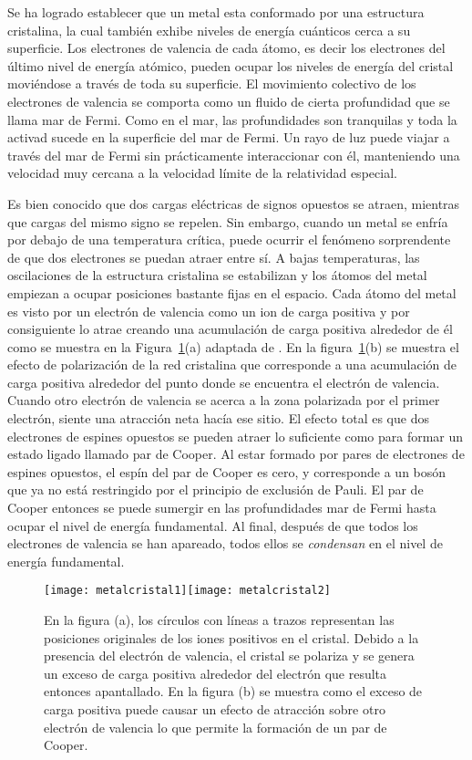 Se ha logrado establecer que un metal esta conformado por una estructura cristalina, la cual también exhibe niveles de energía cuánticos cerca a su superficie. Los electrones de valencia  de cada átomo, es decir los electrones del último nivel de energía atómico, pueden ocupar los niveles de energía del cristal moviéndose a través de toda su superficie. El movimiento colectivo de los electrones de valencia se comporta como un fluido de cierta profundidad que se llama mar de Fermi. Como en el mar, las profundidades son tranquilas y toda la activad sucede en la superficie del mar de Fermi. Un rayo de luz puede viajar a través del mar de Fermi sin prácticamente interaccionar con él, manteniendo una velocidad muy cercana a la velocidad límite de la relatividad especial.

Es bien conocido que dos cargas eléctricas de signos opuestos se atraen, mientras que cargas del mismo signo se repelen. Sin embargo, cuando un metal se enfría por debajo de una temperatura crítica, puede ocurrir el fenómeno sorprendente de que dos electrones se puedan atraer entre sí. A bajas temperaturas, las oscilaciones de la estructura cristalina se estabilizan y los átomos del metal empiezan a ocupar posiciones bastante fijas en el espacio. Cada átomo del metal es visto por un electrón de valencia como un ion de carga positiva y por consiguiente lo atrae creando una acumulación de carga positiva alrededor de él como se muestra en la Figura~\ref{fig:1}(a) adaptada de \cite{beamline}.  En la figura~\ref{fig:1}(b) se muestra  el efecto de polarización de la red cristalina que corresponde a una acumulación de carga positiva alrededor del punto donde se encuentra el electrón de valencia. Cuando otro electrón de valencia se acerca a la zona polarizada por el primer electrón,  siente una atracción neta hacía ese sitio. El efecto total es que dos electrones de espines opuestos se pueden atraer lo suficiente como para formar un estado ligado llamado par de Cooper. Al estar formado por pares de electrones de espines opuestos, el espín del par de Cooper es cero, y corresponde a un  bosón que ya no está restringido por el principio de exclusión de Pauli. El par de Cooper entonces se puede sumergir en las profundidades mar de Fermi hasta ocupar el nivel de energía fundamental. Al final, después de que todos los electrones de valencia se han apareado, todos ellos se \emph{condensan} en el nivel de energía fundamental.

\begin{figure}
  \centering
  \texttt{[image: metalcristal1]}\hspace{4cm}\texttt{[image: metalcristal2]}
  \caption{En la figura (a), los círculos con líneas a trazos representan las posiciones originales de los iones positivos en el cristal. Debido a la presencia del electrón de valencia, el cristal se polariza y se genera un exceso de carga positiva alrededor del electrón que resulta entonces apantallado. En la figura (b) se muestra como el exceso de carga positiva puede causar un efecto de atracción sobre otro electrón de valencia lo que permite la formación de un par de Cooper.}
  \label{fig:1}
\end{figure}

